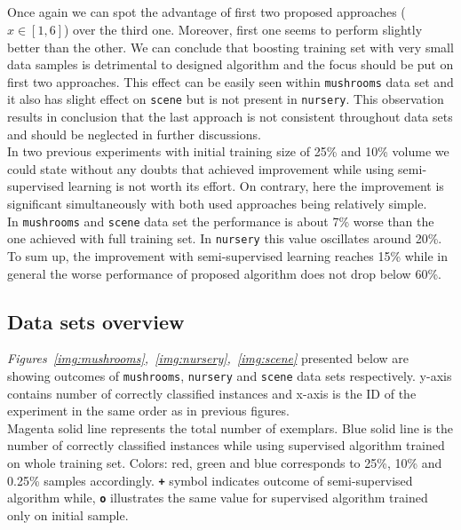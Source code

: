 \documentclass[12pt, a4paper, pdflatex]{report}
\begin{document}
\subsection*{}
Once again we can spot the advantage of first two proposed approaches ($x \in \left [ 1,6   \right ] $) over the third one. Moreover, first one seems to perform slightly better than the other. We can conclude that boosting training set with very small data samples is detrimental to designed algorithm and the focus should be put on first two approaches. This effect can be easily seen within \texttt{mushrooms} data set and it also has slight effect on \texttt{scene} but is not present in \texttt{nursery}. This observation results in conclusion that the last approach is not consistent throughout data sets and should be neglected in further discussions.\\

In two previous experiments with initial training size of 25\% and 10\% volume we could state without any doubts that achieved improvement while using semi-supervised learning is not worth its effort. On contrary, here the improvement is significant simultaneously with both used approaches being relatively simple.\\
In \texttt{mushrooms} and \texttt{scene} data set the performance is about 7\% worse than the one achieved with full training set. In \texttt{nursery} this value oscillates around 20\%.\\
To sum up, the improvement with semi-supervised learning reaches 15\% while in general the worse performance of proposed algorithm does not drop below 60\%.



\subsection{Data sets overview}
\emph{Figures~\ref{img:mushrooms},~\ref{img:nursery},~\ref{img:scene}} presented below are showing outcomes of \texttt{mushrooms}, \texttt{nursery} and \texttt{scene} data sets respectively. y-axis contains number of correctly classified instances and x-axis is the ID of the experiment in the same order as in previous figures.\\
Magenta solid line represents the total number of exemplars. Blue solid line is the number of correctly classified instances while using supervised algorithm trained on whole training set. Colors: red, green and blue corresponds to 25\%, 10\% and 0.25\% samples accordingly. \texttt{\textbf{+}} symbol indicates outcome of semi-supervised algorithm while, \texttt{\textbf{o}} illustrates the same value for supervised algorithm trained only on initial sample.\\
\end{document}
